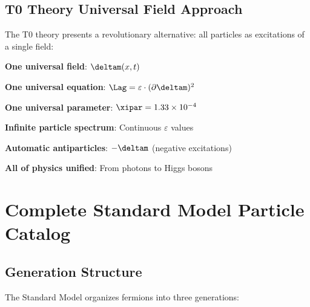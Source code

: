 	\subsection{T0 Theory Universal Field Approach}
	
	The T0 theory presents a revolutionary alternative: all particles as excitations of a single field:
	
	\begin{tcolorbox}[colback=blue!5!white,colframe=blue!75!black,title=T0 Universal Field Simplification]
		\textbf{One universal field}: $\deltam(x,t)$
		
		\textbf{One universal equation}: $\Lag = \varepsilon \cdot (\partial \deltam)^2$
		
		\textbf{One universal parameter}: $\xipar = 1.33 \times 10^{-4}$
		
		\textbf{Infinite particle spectrum}: Continuous $\varepsilon$ values
		
		\textbf{Automatic antiparticles}: $-\deltam$ (negative excitations)
		
		\textbf{All of physics unified}: From photons to Higgs bosons
	\end{tcolorbox}
	
	\section{Complete Standard Model Particle Catalog}
	
	\subsection{Generation Structure}
	
	The Standard Model organizes fermions into three generations:
	
	\begin{table}[htbp]
		\centering
		\caption{Standard Model Three-Generation Structure}
		\label{tab:sm_generations}
	\end{table}
	
